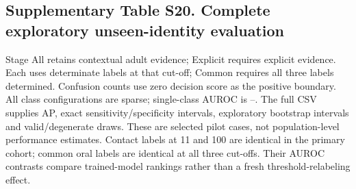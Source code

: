 \subsection*{Supplementary Table S20. Complete exploratory unseen-identity evaluation}

Stage All retains contextual adult evidence; Explicit requires explicit evidence. Each uses determinate labels at that cut-off; Common requires all three labels determined. Confusion counts use zero decision score as the positive boundary. All class configurations are sparse; single-class AUROC is --. The full CSV supplies AP, exact sensitivity/specificity intervals, exploratory bootstrap intervals and valid/degenerate draws. These are selected pilot cases, not population-level performance estimates. Contact labels at 11 and 100 are identical in the primary cohort; common oral labels are identical at all three cut-offs. Their AUROC contrasts compare trained-model rankings rather than a fresh threshold-relabeling effect.

\begingroup\small\setlength{\tabcolsep}{4pt}

